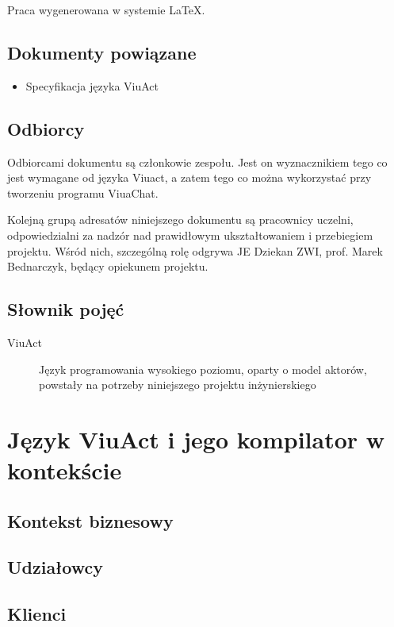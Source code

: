 \documentclass[11pt,oneside,a4paper,titlepage,onecolumn]{article}
\begin{document}
Praca wygenerowana w systemie \LaTeX.

\subsection{Dokumenty powiązane}
\begin{itemize}
	\item Specyfikacja języka ViuAct
\end{itemize}

\subsection{Odbiorcy}

Odbiorcami dokumentu są członkowie zespołu.
Jest on wyznacznikiem tego co jest wymagane od języka Viuact, a zatem tego co można wykorzystać przy tworzeniu
programu ViuaChat.

Kolejną grupą adresatów niniejszego dokumentu są pracownicy uczelni, odpowiedzialni za nadzór nad prawidłowym ukształtowaniem i przebiegiem projektu.
Wśród nich, szczególną rolę odgrywa JE Dziekan ZWI, prof. Marek Bednarczyk, będący opiekunem projektu.

\subsection{Słownik pojęć}
\begin{description}
  \item[ViuAct] Język programowania wysokiego poziomu, oparty o model aktorów, powstały na potrzeby niniejszego projektu inżynierskiego
\end{description}

\section{Język ViuAct i jego kompilator w kontekście}

\subsection{Kontekst biznesowy}

\subsection{Udziałowcy}

\subsection{Klienci}
\end{document}
